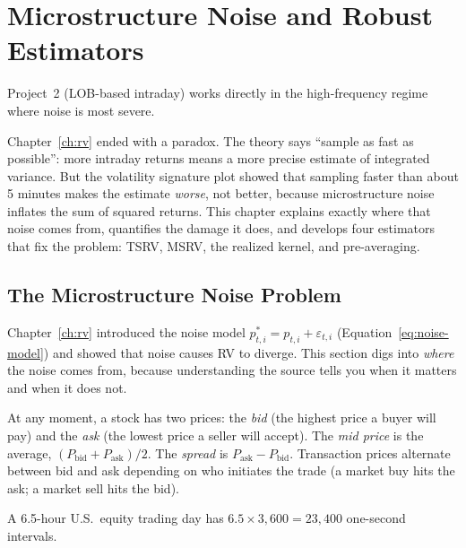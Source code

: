 \chapter{Microstructure Noise and Robust Estimators}
\label{ch:noise}

\begin{application}
Project~2 (LOB-based intraday) works directly in the high-frequency regime where noise is most severe.
\end{application}

Chapter~\ref{ch:rv} ended with a paradox.
The theory says ``sample as fast as possible'': more intraday returns means a more precise estimate of integrated variance.
But the volatility signature plot showed that sampling faster than about 5 minutes makes the estimate \emph{worse}, not better, because microstructure noise inflates the sum of squared returns.
This chapter explains exactly where that noise comes from, quantifies the damage it does, and develops four estimators that fix the problem: TSRV, MSRV, the realized kernel, and pre-averaging.

\section{The Microstructure Noise Problem}
\label{sec:noise-problem}

Chapter~\ref{ch:rv} introduced the noise model $p^*_{t,i} = p_{t,i} + \varepsilon_{t,i}$ (Equation~\ref{eq:noise-model}) and showed that noise causes RV to diverge.
This section digs into \emph{where} the noise comes from, because understanding the source tells you when it matters and when it does not.

\begin{prereq}
At any moment, a stock has two prices: the \emph{bid} (the highest price a buyer will pay) and the \emph{ask} (the lowest price a seller will accept).
The \emph{mid price} is the average, $(P_{\text{bid}} + P_{\text{ask}})/2$.
The \emph{spread} is $P_{\text{ask}} - P_{\text{bid}}$.
Transaction prices alternate between bid and ask depending on who initiates the trade (a market buy hits the ask; a market sell hits the bid).
\end{prereq}

\begin{prereq}
A 6.5-hour U.S.\ equity trading day has $6.5 \times 3{,}600 = 23{,}400$ one-second intervals.
\end{prereq}

